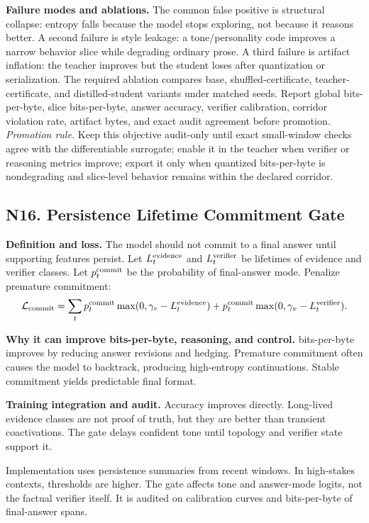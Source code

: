 \documentclass[10pt]{article}
\newcommand{\loss}{\mathcal{L}}
\numberwithin{equation}{section}
\begin{document}
\noindent\textbf{Failure modes and ablations.} The common false positive is structural collapse: entropy falls because the model stops exploring, not because it reasons better. A second failure is style leakage: a tone/personality code improves a narrow behavior slice while degrading ordinary prose. A third failure is artifact inflation: the teacher improves but the student loses after quantization or serialization. The required ablation compares base, shuffled-certificate, teacher-certificate, and distilled-student variants under matched seeds. Report global bits-per-byte, slice bits-per-byte, answer accuracy, verifier calibration, corridor violation rate, artifact bytes, and exact audit agreement before promotion.
\vfill
\noindent\emph{Promotion rule.} Keep this objective audit-only until exact small-window checks agree with the differentiable surrogate; enable it in the teacher when verifier or reasoning metrics improve; export it only when quantized bits-per-byte is nondegrading and slice-level behavior remains within the declared corridor.
\clearpage
\subsection{N16. Persistence Lifetime Commitment Gate}
\noindent\textbf{Definition and loss.} The model should not commit to a final answer until supporting features persist. Let $L_t^{\rm evidence}$ and $L_t^{\rm verifier}$ be lifetimes of evidence and verifier classes. Let $p_t^{\rm commit}$ be the probability of final-answer mode. Penalize premature commitment:
\[
\loss_{\rm commit}=\sum_t p_t^{\rm commit}\max(0,\gamma_e-L_t^{\rm evidence})+p_t^{\rm commit}\max(0,\gamma_v-L_t^{\rm verifier}).
\]

\noindent\textbf{Why it can improve bits-per-byte, reasoning, and control.} bits-per-byte improves by reducing answer revisions and hedging. Premature commitment often causes the model to backtrack, producing high-entropy continuations. Stable commitment yields predictable final format.

\noindent\textbf{Training integration and audit.} Accuracy improves directly. Long-lived evidence classes are not proof of truth, but they are better than transient coactivations. The gate delays confident tone until topology and verifier state support it.

Implementation uses persistence summaries from recent windows. In high-stakes contexts, thresholds are higher. The gate affects tone and answer-mode logits, not the factual verifier itself. It is audited on calibration curves and bits-per-byte of final-answer spans.
\end{document}
